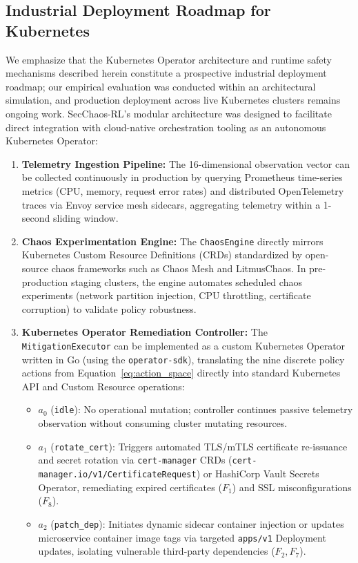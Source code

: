 \documentclass[ASNA,twocolumn]{USG}
\begin{document}
\subsection{Industrial Deployment Roadmap for Kubernetes}
We emphasize that the Kubernetes Operator architecture and runtime safety mechanisms described herein constitute a prospective industrial deployment roadmap; our empirical evaluation was conducted within an architectural simulation, and production deployment across live Kubernetes clusters remains ongoing work. SecChaos-RL's modular architecture was designed to facilitate direct integration with cloud-native orchestration tooling as an autonomous Kubernetes Operator:
\begin{enumerate}
    \item \textbf{Telemetry Ingestion Pipeline:} The 16-dimensional observation vector can be collected continuously in production by querying Prometheus time-series metrics (CPU, memory, request error rates) and distributed OpenTelemetry traces via Envoy service mesh sidecars, aggregating telemetry within a 1-second sliding window.
    \item \textbf{Chaos Experimentation Engine:} The \texttt{ChaosEngine} directly mirrors Kubernetes Custom Resource Definitions (CRDs) standardized by open-source chaos frameworks such as Chaos Mesh and LitmusChaos. In pre-production staging clusters, the engine automates scheduled chaos experiments (network partition injection, CPU throttling, certificate corruption) to validate policy robustness.
    \item \textbf{Kubernetes Operator Remediation Controller:} The \texttt{MitigationExecutor} can be implemented as a custom Kubernetes Operator written in Go (using the \texttt{operator-sdk}), translating the nine discrete policy actions from Equation~\eqref{eq:action_space} directly into standard Kubernetes API and Custom Resource operations:
    \begin{itemize}
        \item $a_0$ (\texttt{idle}): No operational mutation; controller continues passive telemetry observation without consuming cluster mutating resources.
        \item $a_1$ (\texttt{rotate\_cert}): Triggers automated TLS/mTLS certificate re-issuance and secret rotation via \texttt{cert-manager} CRDs (\texttt{cert-manager.io/v1/CertificateRequest}) or HashiCorp Vault Secrets Operator, remediating expired certificates ($F_1$) and SSL misconfigurations ($F_8$).
        \item $a_2$ (\texttt{patch\_dep}): Initiates dynamic sidecar container injection or updates microservice container image tags via targeted \texttt{apps/v1} Deployment updates, isolating vulnerable third-party dependencies ($F_2, F_7$).

\end{itemize}
\end{enumerate}
\end{document}
